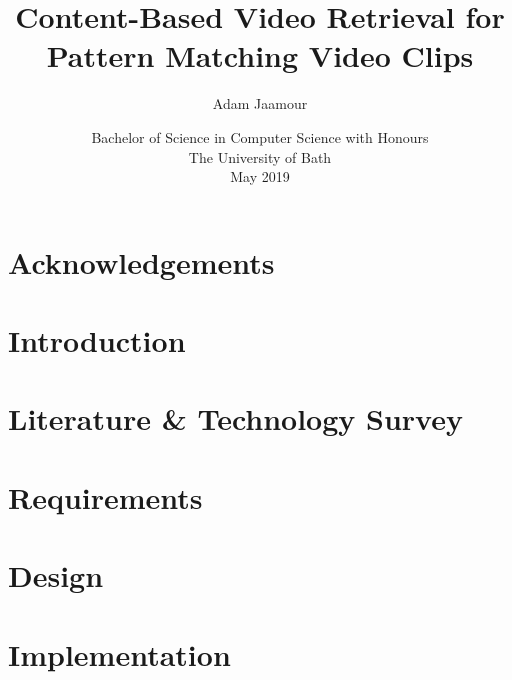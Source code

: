 \documentclass[11pt,openright,twoside,a4paper]{report}
\title{Content-Based Video Retrieval for Pattern Matching Video Clips}
\author{Adam Jaamour}
\date{Bachelor of Science in Computer Science with Honours\\The University of Bath\\May 2019}
\begin{document}
\setcounter{page}{0}

\maketitle
\newpage

\newpage

\newpage

\abstract

\newpage

\setcounter{tocdepth}{3}
\tableofcontents
\newpage
\listoffigures
\newpage
\listoftables
\newpage

\chapter*{Acknowledgements}

\newpage


\setcounter{page}{1}

\chapter{Introduction}
\label{ch:chapter1}


\chapter{Literature \& Technology Survey}
\label{ch:chapter2}


\chapter{Requirements}
\label{ch:chapter3}


\chapter{Design}
\label{ch:chapter4}


\chapter{Implementation}
\label{ch:chapter5}

\end{document}
